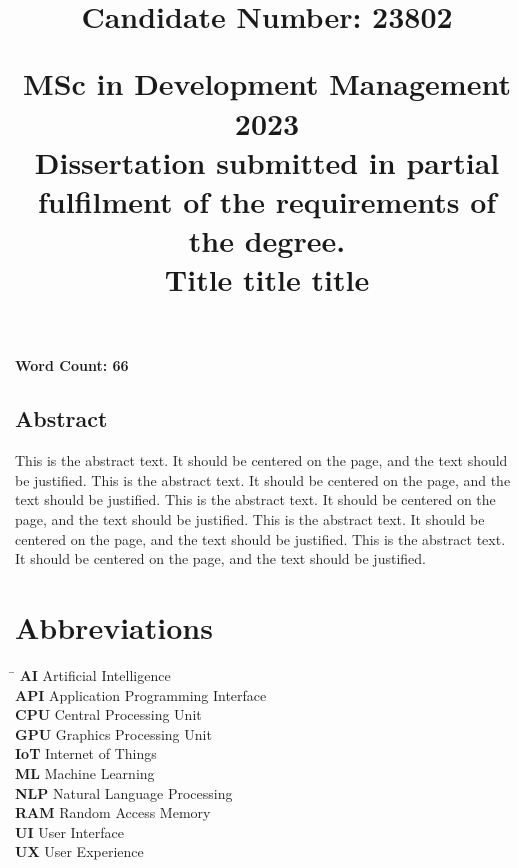 \documentclass{article}%
\title{
        \begin{flushright}
        \large \textbf{Candidate Number: 23802}
        \end{flushright}
        \vspace*{30mm}
        \begin{center}
        \large MSc in Development Management 2023 \\
        \vspace*{5mm}
        Dissertation submitted in partial fulfilment of the requirements of the degree. \\
        \vspace*{35mm}
        \Huge \textbf{Title title title} \\
        \vspace*{20mm}
        \end{center}
    }%
\date{}%
\begin{document}
%
\normalsize%
%
\pagestyle{frontmatter}%
\maketitle%

\vfill
\begin{center}\textbf{Word Count: 66}\end{center}
\newpage%
\vspace*{\fill}%
\begin{center}%
\begin{minipage}{0.8\textwidth}%
\begin{center}%
\section*{Abstract}%
\end{center}%
\justify%
This is the abstract text. It should be centered on the page, and the text should be justified. This is the abstract text. It should be centered on the page, and the text should be justified. This is the abstract text. It should be centered on the page, and the text should be justified. This is the abstract text. It should be centered on the page, and the text should be justified. This is the abstract text. It should be centered on the page, and the text should be justified. %
\end{minipage}%
\end{center}%
\vspace*{\fill}%
\newpage%
\tableofcontents%
\newpage%
\section*{Abbreviations}%
\label{sec:Abbreviations}%
\begin{tabbing}%
\hspace{3cm} \= \kill%
\textbf{AI} \> Artificial Intelligence \\%
\textbf{API} \> Application Programming Interface \\%
\textbf{CPU} \> Central Processing Unit \\%
\textbf{GPU} \> Graphics Processing Unit \\%
\textbf{IoT} \> Internet of Things \\%
\textbf{ML} \> Machine Learning \\%
\textbf{NLP} \> Natural Language Processing \\%
\textbf{RAM} \> Random Access Memory \\%
\textbf{UI} \> User Interface \\%
\textbf{UX} \> User Experience \\%
\end{tabbing}
\end{document}
